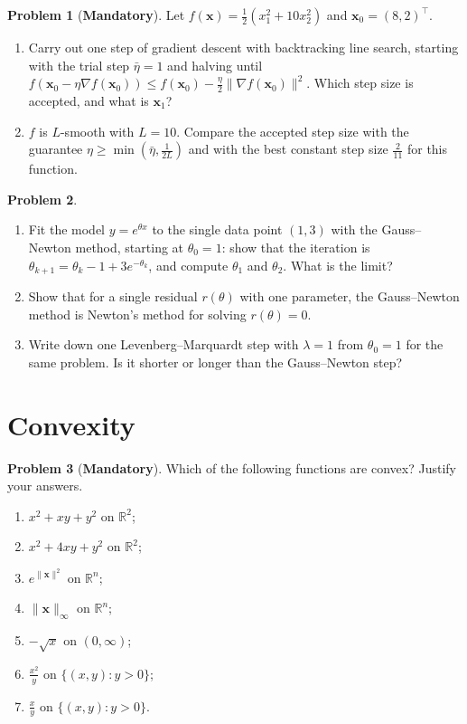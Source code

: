 \documentclass[11pt]{article}
\theoremstyle{definition}
\newtheorem{problem}{Problem}[section]
\newcommand{\mandatory}{\textcolor{red!70!black}{\textbf{Mandatory}}}
\newcommand{\norm}[1]{\lVert #1 \rVert}
\begin{document}
\begin{problem}[\mandatory]\label{pr:backtracking}
    Let $f(\mathbf{x}) = \frac{1}{2}(x_1^2 + 10x_2^2)$ and $\mathbf{x}_0 = (8, 2)^\top$.
    \begin{enumerate}[label=(\alph*)]
        \item Carry out one step of gradient descent with backtracking line search, starting with the trial step $\bar\eta = 1$ and halving until $f(\mathbf{x}_0 - \eta\nabla f(\mathbf{x}_0)) \leq f(\mathbf{x}_0) - \frac{\eta}{2}\norm{\nabla f(\mathbf{x}_0)}^2$. Which step size is accepted, and what is $\mathbf{x}_1$?
        \item $f$ is $L$-smooth with $L = 10$. Compare the accepted step size with the guarantee $\eta \geq \min(\bar\eta, \frac{1}{2L})$ and with the best constant step size $\frac{2}{11}$ for this function.
    \end{enumerate}
\end{problem}

\begin{problem}\label{pr:gauss-newton}
    \begin{enumerate}[label=(\alph*)]
        \item Fit the model $y = e^{\theta x}$ to the single data point $(1, 3)$ with the Gauss--Newton method, starting at $\theta_0 = 1$: show that the iteration is $\theta_{k+1} = \theta_k - 1 + 3e^{-\theta_k}$, and compute $\theta_1$ and $\theta_2$. What is the limit?
        \item Show that for a single residual $r(\theta)$ with one parameter, the Gauss--Newton method is Newton's method for solving $r(\theta) = 0$.
        \item Write down one Levenberg--Marquardt step with $\lambda = 1$ from $\theta_0 = 1$ for the same problem. Is it shorter or longer than the Gauss--Newton step?
    \end{enumerate}
\end{problem}

\section{Convexity}

\begin{problem}[\mandatory]\label{pr:convex-which}
    Which of the following functions are convex? Justify your answers.
    \begin{enumerate}[label=(\alph*)]
        \item $x^2 + xy + y^2$ on $\mathbb{R}^2$;
        \item $x^2 + 4xy + y^2$ on $\mathbb{R}^2$;
        \item $e^{\norm{\mathbf{x}}^2}$ on $\mathbb{R}^n$;
        \item $\norm{\mathbf{x}}_\infty$ on $\mathbb{R}^n$;
        \item $-\sqrt{x}$ on $(0, \infty)$;
        \item $\frac{x^2}{y}$ on $\{(x, y) : y > 0\}$;
        \item $\frac{x}{y}$ on $\{(x, y) : y > 0\}$.
    \end{enumerate}
\end{problem}
\end{document}
